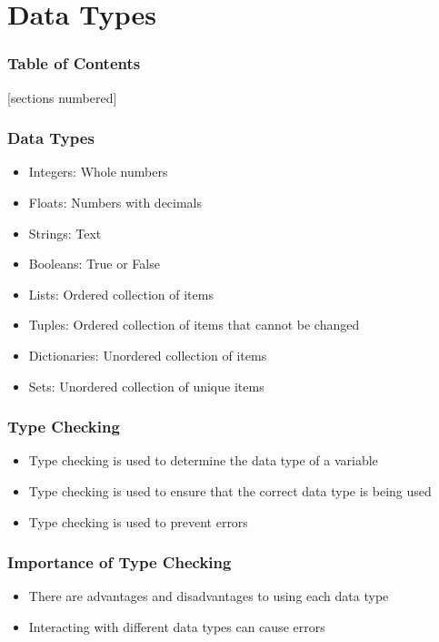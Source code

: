 \documentclass[serif, 9pt, aspectratio=32]{beamer}
\begin{document}
\section{Data Types}

\begin{frame}
    \frametitle{Table of Contents}
    [sections numbered]
    \tableofcontents[currentsection]
\end{frame}

\begin{frame}
    \centering
    \frametitle{Data Types}
    \begin{itemize}
        \setlength{\itemsep}{1em}
        \item Integers: Whole numbers
        \item Floats: Numbers with decimals
        \item Strings: Text
        \item Booleans: True or False
        \item Lists: Ordered collection of items
        \item Tuples: Ordered collection of items that cannot be changed
        \item Dictionaries: Unordered collection of items
        \item Sets: Unordered collection of unique items
    \end{itemize}
\end{frame}

\begin{frame}
    \centering
    \frametitle{Type Checking}
    \begin{itemize}
        \setlength{\itemsep}{3em}
        \item Type checking is used to determine the data type of a variable
        \item Type checking is used to ensure that the correct data type is being used
        \item Type checking is used to prevent errors
    \end{itemize}
\end{frame}

\begin{frame}
    \centering
    \frametitle{Importance of Type Checking}
    \begin{itemize}
        \setlength{\itemsep}{3em}
        \item There are advantages and disadvantages to using each data type
        \item Interacting with different data types can cause errors
    \end{itemize}
\end{frame}
\end{document}
